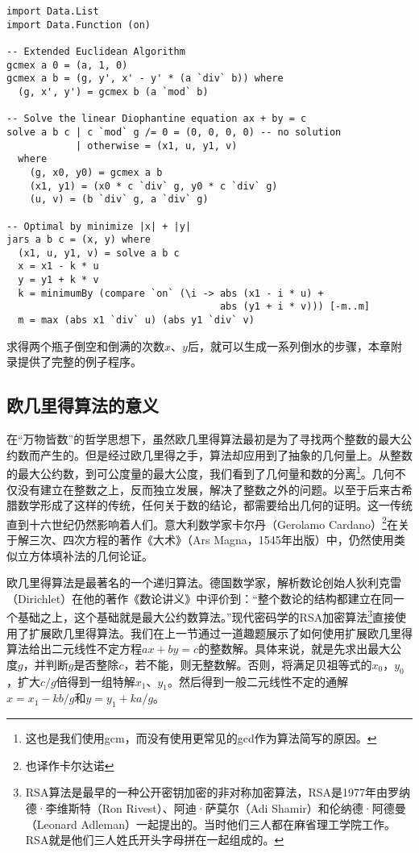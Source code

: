 \documentclass[UTF8]{article}
\begin{document}
\lstset{frame=single}
\begin{lstlisting}
import Data.List
import Data.Function (on)

-- Extended Euclidean Algorithm
gcmex a 0 = (a, 1, 0)
gcmex a b = (g, y', x' - y' * (a `div` b)) where
  (g, x', y') = gcmex b (a `mod` b)

-- Solve the linear Diophantine equation ax + by = c
solve a b c | c `mod` g /= 0 = (0, 0, 0, 0) -- no solution
            | otherwise = (x1, u, y1, v)
  where
    (g, x0, y0) = gcmex a b
    (x1, y1) = (x0 * c `div` g, y0 * c `div` g)
    (u, v) = (b `div` g, a `div` g)

-- Optimal by minimize |x| + |y|
jars a b c = (x, y) where
  (x1, u, y1, v) = solve a b c
  x = x1 - k * u
  y = y1 + k * v
  k = minimumBy (compare `on` (\i -> abs (x1 - i * u) +
                                     abs (y1 + i * v))) [-m..m]
  m = max (abs x1 `div` u) (abs y1 `div` v)
\end{lstlisting}

求得两个瓶子倒空和倒满的次数$x$、$y$后，就可以生成一系列倒水的步骤，本章附录提供了完整的例子程序。

\subsection{欧几里得算法的意义}

在“万物皆数”的哲学思想下，虽然欧几里得算法最初是为了寻找两个整数的最大公约数而产生的。但是经过欧几里得之手，算法却应用到了抽象的几何量上。从整数的最大公约数，到可公度量的最大公度，我们看到了几何量和数的分离\footnote{这也是我们使用gcm，而没有使用更常见的gcd作为算法简写的原因。}。几何不仅没有建立在整数之上，反而独立发展，解决了整数之外的问题。以至于后来古希腊数学形成了这样的传统，任何关于数的结论，都需要给出几何的证明。这一传统直到十六世纪仍然影响着人们。意大利数学家卡尔丹（Gerolamo Cardano）\footnote{也译作卡尔达诺}在关于解三次、四次方程的著作《大术》（Ars Magna，1545年出版）中，仍然使用类似立方体填补法的几何论证\cite{HanXueTao2009}。

欧几里得算法是最著名的一个递归算法。德国数学家，解析数论创始人狄利克雷（Dirichlet）在他的著作《数论讲义》中评价到：“整个数论的结构都建立在同一个基础之上，这个基础就是最大公约数算法。”现代密码学的RSA加密算法\footnote{RSA算法是最早的一种公开密钥加密的非对称加密算法，RSA是1977年由罗纳德·李维斯特（Ron Rivest）、阿迪·萨莫尔（Adi Shamir）和伦纳德·阿德曼（Leonard Adleman）一起提出的。当时他们三人都在麻省理工学院工作。RSA就是他们三人姓氏开头字母拼在一起组成的。}直接使用了扩展欧几里得算法。我们在上一节通过一道趣题展示了如何使用扩展欧几里得算法给出二元线性不定方程$ax + by = c$的整数解。具体来说，就是先求出最大公度$g$，并判断$g$是否整除$c$，若不能，则无整数解。否则，将满足贝祖等式的$x_0$，$y_0$，扩大$c/g$倍得到一组特解$x_1$、$y_1$。然后得到一般二元线性不定的通解$x = x_1 - k b / g$和$y = y_1 + k a / g$。
\end{document}
